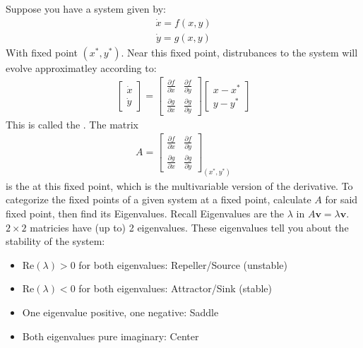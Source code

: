 \documentclass[letterpaper,10pt,english]{jupyterBook}
\begin{document}
\sphinxAtStartPar
Suppose you have a system given by:
\begin{equation*}
\begin{split}
\dot{x} = f(x,y)
\end{split}
\end{equation*}\begin{equation*}
\begin{split}
\dot{y} = g(x,y)
\end{split}
\end{equation*}
\sphinxAtStartPar
With fixed point \((x^*,y^*)\). Near this fixed point, distrubances to the system will evolve approximatley according to:
\begin{equation*}
\begin{split}
\begin{bmatrix} \dot{x} \\ \dot{y} \end{bmatrix} = \begin{bmatrix} \frac{\partial f}{\partial x} & \frac{\partial f}{\partial y} \\ \frac{\partial g}{\partial x} & \frac{\partial g}{\partial y}\end{bmatrix} \begin{bmatrix}x - x^* \\ y - y^*\end{bmatrix}
\end{split}
\end{equation*}
\sphinxAtStartPar
This is called the . The matrix
\begin{equation*}
\begin{split}
A = \begin{bmatrix} \frac{\partial f}{\partial x} & \frac{\partial f}{\partial y} \\ \frac{\partial g}{\partial x} & \frac{\partial g}{\partial y}\end{bmatrix}_{(x^*,y^*)}
\end{split}
\end{equation*}
\sphinxAtStartPar
is the  at this fixed point, which is the multivariable version of the derivative. To categorize the fixed points of a given system at a fixed point, calculate \(A\) for said fixed point, then find its Eigenvalues. Recall Eigenvalues are the \(\lambda\) in \(A\mathbf{v} = \lambda \mathbf{v}\). \(2\times2\) matricies have (up to) 2 eigenvalues. These eigenvalues tell you about the stability of the system:
\begin{itemize}
\item {} 
\sphinxAtStartPar
\(\mathrm{Re}(\lambda) > 0 \) for both eigenvalues: Repeller/Source (unstable)

\item {} 
\sphinxAtStartPar
\(\mathrm{Re}(\lambda) < 0 \) for both eigenvalues: Attractor/Sink  (stable)

\item {} 
\sphinxAtStartPar
One eigenvalue positive, one negative: Saddle

\item {} 
\sphinxAtStartPar
Both eigenvalues pure imaginary: Center

\end{itemize}
\end{document}
